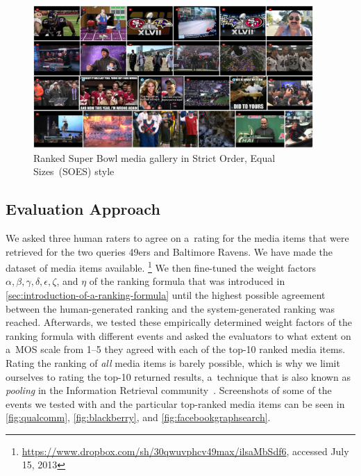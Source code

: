\begin{figure}
  \centering
  \includegraphics[width=0.95\textwidth,height=0.9\textheight,keepaspectratio]{strict_order.png}
  \caption[Ranked Super Bowl media gallery in Strict Order, Equal Sizes style]
  {Ranked Super Bowl media gallery in Strict Order, Equal Sizes~(SOES) style }
  \label{fig:strict_order}
\end{figure}  

\subsection{Evaluation Approach}

We asked three human raters to agree on a~rating for the media items
that were retrieved for the two queries 49ers and Baltimore Ravens.
We have made the dataset of media items available.%
\footnote{\url{https://www.dropbox.com/sh/30qwuvphcv49max/ilsaMbSdf6},
accessed July 15, 2013}
We then fine-tuned the weight factors
$ \alpha, \beta, \gamma, \delta, \epsilon, \zeta $, and $ \eta $ of the ranking formula
that was introduced in \autoref{sec:introduction-of-a-ranking-formula}
until the highest possible agreement between the human-generated ranking
and the system-generated ranking was reached.
Afterwards, we tested these empirically determined weight factors of the ranking formula
with different events and asked the evaluators to what extent
on a~MOS scale from 1--5 they agreed with each of the top-10 ranked media items.
Rating the ranking of \emph{all} media items is barely possible,
which is why we limit ourselves to rating the top-10 returned results,
a~technique that is also known as \emph{pooling}
in the Information Retrieval community~\cite{liu2009learningtorank}.
Screenshots of some of the events we tested with
and the particular top-ranked media items can be seen in 
\autoref{fig:qualcomm}, \autoref{fig:blackberry}, and \autoref{fig:facebookgraphsearch}.

